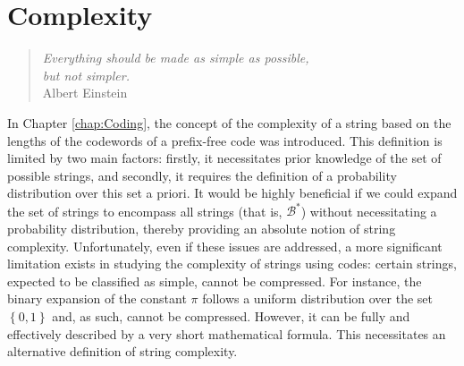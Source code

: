 %
%


%


\chapter{Complexity}
\label{chap:Algorithmic_Information}

\begin{quote}
\begin{flushright}
\emph{Everything should be made as simple as possible, \\
but not simpler. \\}
Albert Einstein
\end{flushright}
\end{quote}
\bigskip

In Chapter \ref{chap:Coding}, the concept of the complexity of a string based on the lengths of the codewords of a prefix-free code was introduced. This definition is limited by two main factors: firstly, it necessitates prior knowledge of the set of possible strings, and secondly, it requires the definition of a probability distribution over this set a priori. It would be highly beneficial if we could expand the set of strings to encompass all strings (that is, $\mathcal{B}^\ast$) without necessitating a probability distribution, thereby providing an absolute notion of string complexity. Unfortunately, even if these issues are addressed, a more significant limitation exists in studying the complexity of strings using codes: certain strings, expected to be classified as simple, cannot be compressed. For instance, the binary expansion of the constant $\pi$ follows a uniform distribution over the set $\left\{0, 1\right\}$ and, as such, cannot be compressed. However, it can be fully and effectively described by a very short mathematical formula. This necessitates an alternative definition of string complexity.


